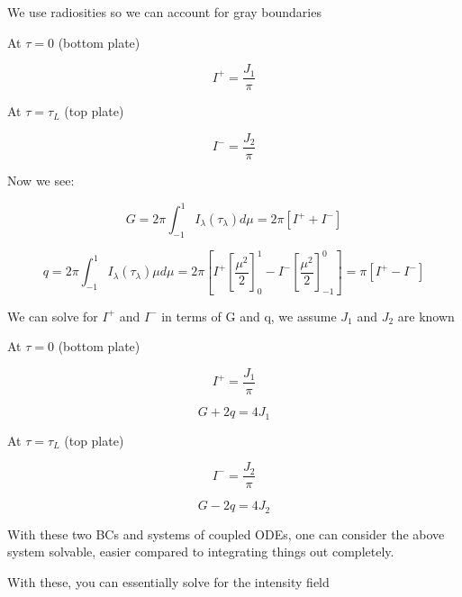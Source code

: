 \documentclass[12pt]{article}
\renewcommand{\_}{\kern-1.5pt\textunderscore\kern-1.5pt}
\begin{document}
\begin{itemize}
We use radiosities so we can account for gray boundaries\par

At  \(  \tau=0  \) (bottom plate)\par

 \[ I^{+}=\frac{J_{1}}{ \pi } \] \par

At  \(  \tau= \tau_{L} \)  (top plate)\par

 \[ I^{-}=\frac{J_{2}}{ \pi } \] \par

Now we see:\par

 \[ G=2 \pi  \int _{-1}^{1}I_{ \lambda } \left(  \tau_{ \lambda } \right) d \mu =2 \pi  \left[ I^{+}+I^{-} \right]  \] \par

 \[ q=2 \pi  \int _{-1}^{1}I_{ \lambda } \left(  \tau_{ \lambda } \right)  \mu  d \mu =2 \pi  \left[ I^{+} \left[ \frac{ \mu ^{2}}{2} \right] _{0}^{1}-I^{-} \left[ \frac{ \mu ^{2}}{2} \right] _{-1}^{0} \right] = \pi  \left[ I^{+}-I^{-} \right]  \] \par

We can solve for  \( I^{+} \)  and  \( I^{-} \)  in terms of G and q, we assume  \( J_{1} \)  and  \( J_{2} \)  are known\par

At  \(  \tau=0  \) (bottom plate)\par

 \[ I^{+}=\frac{J_{1}}{ \pi } \] \par

 \[ G+2q=4J_{1} \] \par

At  \(  \tau= \tau_{L} \)  (top plate)\par

 \[ I^{-}=\frac{J_{2}}{ \pi } \] \par

 \[ G-2q=4J_{2} \] \par

With these two BCs and systems of coupled ODEs, one can consider the above system solvable, easier compared to integrating things out completely. \par


\vspace{\baselineskip}
With these, you can essentially solve for the intensity field\par


\end{itemize}
\end{document}
